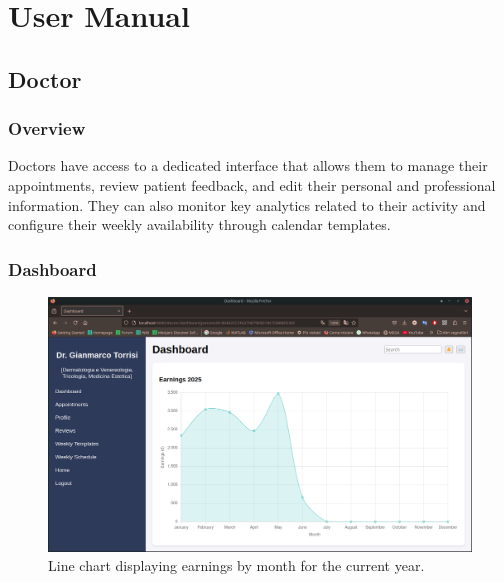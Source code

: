 \chapter{User Manual}

\section{Doctor}

\subsection{Overview}
Doctors have access to a dedicated interface that allows them to manage their appointments, review patient feedback, and edit their personal and professional information. They can also monitor key analytics related to their activity and configure their weekly availability through calendar templates.

\subsection{Dashboard}

\begin{figure}[!h]
    \centering
	\includegraphics[scale=0.30]{resources/screenshots/doctor_ui/earnings_linechart.png}
    \caption{Line chart displaying earnings by month for the current year.}
    \label{fig:earnings_linechart}
\end{figure}

